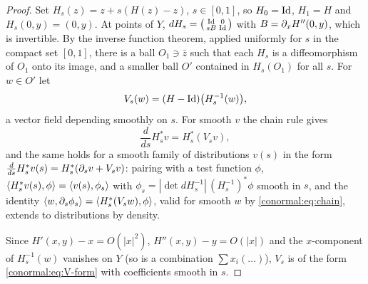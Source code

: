 \begin{proof}
  Set $H_s(z)=z+s(H(z)-z)$, $s\in[0,1]$, so $H_0=\operatorname{Id}$, $H_1=H$ and
  $H_s(0,y)=(0,y)$.  At points of $Y$, $dH_s=\begin{psmallmatrix}\operatorname{Id}&0\\
  sB&\operatorname{Id}\end{psmallmatrix}$ with $B=\partial_xH''(0,y)$, which is invertible.  By the
  inverse function theorem, applied uniformly for $s$ in the compact set
  $[0,1]$, there is a ball $O_1\ni\bar z$ such that each $H_s$ is a
  diffeomorphism of $O_1$ onto its image, and a smaller ball $O'$ contained in
  $H_s(O_1)$ for all $s$.  For $w\in O'$ let
  \begin{equation*}
    V_s(w)=(H-\operatorname{Id})\big(H_s^{-1}(w)\big),
  \end{equation*}
  a vector field depending smoothly on $s$.  For smooth $v$ the chain rule gives
  \begin{equation}\label{conormal:eq:chain}
    \frac{d}{ds}H_s^*v=H_s^*(V_sv),
  \end{equation}
  and the same holds for a smooth family of distributions $v(s)$ in the form
  $\frac d{ds}H_s^*v(s)=H_s^*(\partial_sv+V_sv)$: pairing with a test function
  $\phi$, $\langle H_s^*v(s), \phi\rangle=\langle v(s), \phi_s\rangle$ with
  $\phi_s=|\det dH_s^{-1}|\,(H_s^{-1})^*\phi$ smooth in $s$, and the identity
  $\langle w, \partial_s\phi_s\rangle=\langle H_s^*(V_sw), \phi\rangle$, valid for smooth $w$ by
  \eqref{conormal:eq:chain}, extends to distributions by density.

  Since $H'(x,y)-x=O(|x|^2)$, $H''(x,y)-y=O(|x|)$ and the $x$-component of
  $H_s^{-1}(w)$ vanishes on $Y$ (so is a combination $\sum x_i(\dots)$), $V_s$
  is of the form \eqref{conormal:eq:V-form} with coefficients smooth in $s$.


\end{proof}
